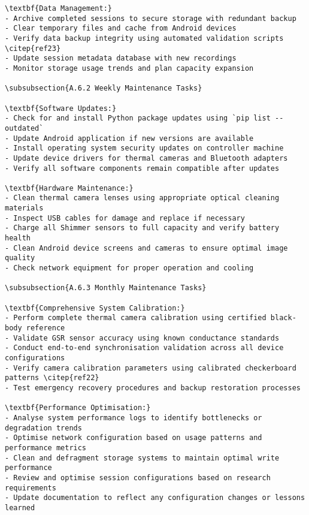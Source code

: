 \begin{verbatim}
\textbf{Data Management:}
- Archive completed sessions to secure storage with redundant backup
- Clear temporary files and cache from Android devices
- Verify data backup integrity using automated validation scripts \citep{ref23}
- Update session metadata database with new recordings
- Monitor storage usage trends and plan capacity expansion

\subsubsection{A.6.2 Weekly Maintenance Tasks}

\textbf{Software Updates:}
- Check for and install Python package updates using `pip list --outdated`
- Update Android application if new versions are available
- Install operating system security updates on controller machine
- Update device drivers for thermal cameras and Bluetooth adapters
- Verify all software components remain compatible after updates

\textbf{Hardware Maintenance:}
- Clean thermal camera lenses using appropriate optical cleaning materials
- Inspect USB cables for damage and replace if necessary
- Charge all Shimmer sensors to full capacity and verify battery health
- Clean Android device screens and cameras to ensure optimal image quality
- Check network equipment for proper operation and cooling

\subsubsection{A.6.3 Monthly Maintenance Tasks}

\textbf{Comprehensive System Calibration:}
- Perform complete thermal camera calibration using certified black-body reference
- Validate GSR sensor accuracy using known conductance standards
- Conduct end-to-end synchronisation validation across all device configurations
- Verify camera calibration parameters using calibrated checkerboard patterns \citep{ref22}
- Test emergency recovery procedures and backup restoration processes

\textbf{Performance Optimisation:}
- Analyse system performance logs to identify bottlenecks or degradation trends
- Optimise network configuration based on usage patterns and performance metrics
- Clean and defragment storage systems to maintain optimal write performance
- Review and optimise session configurations based on research requirements
- Update documentation to reflect any configuration changes or lessons learned


\end{verbatim}

